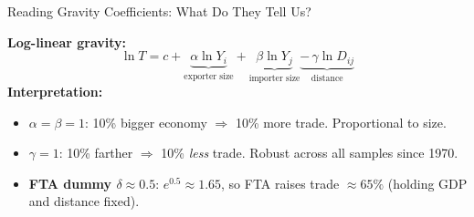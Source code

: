 \documentclass[aspectratio=169]{beamer}
\begin{document}
\begin{frame}{Reading Gravity Coefficients: What Do They Tell Us?}


\textbf{Log-linear gravity:}
\[\ln T = c + \underbrace{\alpha\ln Y_i}_{\text{exporter size}} + \underbrace{\beta\ln Y_j}_{\text{importer size}} \underbrace{-\,\gamma\ln D_{ij}}_{\text{distance}}\]
\textbf{Interpretation:}
\begin{itemize}\small
  \item \textbf{$\alpha=\beta=1$}: 10\% bigger economy $\Rightarrow$ 10\% more trade. Proportional to size.
  \item \textbf{$\gamma=1$}: 10\% farther $\Rightarrow$ 10\% \emph{less} trade. Robust across all samples since 1970.
  \item \textbf{FTA dummy $\delta\approx 0.5$}: $e^{0.5}\approx 1.65$, so FTA raises trade $\approx65\%$ (holding GDP and distance fixed).
\end{itemize}



\end{frame}
\end{document}

